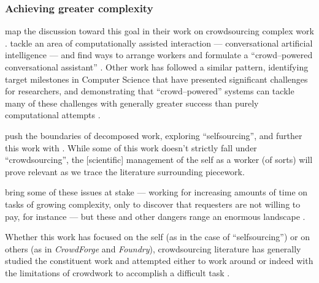 \documentclass[trackingWork]{subfiles}
\begin{document}
\subsubsection{Achieving greater complexity}\label{sec:Complexity}
\citeauthor{crowdForgeKittur}
map the discussion toward this goal in their work on
crowdsourcing complex work
\cite{crowdForgeKittur}.
\citeauthor{Lasecki:2013:CCC:2501988.2502057} tackle an area of computationally assisted interaction
--- conversational artificial intelligence ---
and find ways to arrange workers and formulate a ``crowd--powered conversational assistant''
\cite{Lasecki:2013:CCC:2501988.2502057}.
Other work has followed a similar pattern,
identifying target milestones in Computer Science
that have presented significant challenges for researchers,
and demonstrating that ``crowd--powered'' systems can tackle many of these challenges
with generally greater success than purely computational attempts
\cite[][and others]{Lasecki:2013:RCL:2441776.2441912,foundry}.

\citeauthor{selfsourcingTeevan2014} push the boundaries of decomposed work,
exploring ``selfsourcing'', and further this work with \citeauthor{selfsourcingTeevan2016}
\cite{selfsourcingTeevan2014,selfsourcingTeevan2016}.
While some of this work doesn't strictly fall under ``crowdsourcing'',
the [scientific] management of the self as a worker
(of sorts)
will prove relevant as we trace the literature surrounding piecework.

\citeauthor{professionalCrowdworkEthics} bring some of these issues at stake
--- working for increasing amounts of time on tasks of growing complexity, only to discover that requesters are not willing to pay,
for instance ---
but these and other dangers range an enormous landscape %
\cite{crowdworkFuture,professionalCrowdworkEthics,nickerson2013crowd,dynamo}.

Whether this work has focused on the self (as in the case of ``selfsourcing'')
or on others (as in \textit{CrowdForge} and \textit{Foundry}),
crowdsourcing literature has generally studied the constituent work
and attempted either to work around or indeed with the limitations of crowdwork to accomplish a difficult task
\cite{selfsourcingTeevan2014,selfsourcingTeevan2016,crowdForgeKittur,foundry}.
\end{document}
